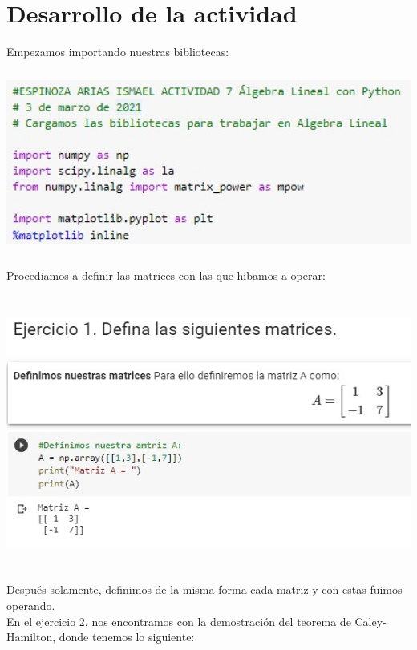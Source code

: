 \documentclass[12pt]{article}
\begin{document}


\section{Desarrollo de la actividad}

Empezamos importando nuestras bibliotecas:

    \begin{center}
	\includegraphics[height=6cm]{Bibliotecas.jpeg}\\
    \end{center}
    
Procediamos a definir las matrices con las que hibamos a operar:

    \begin{center}
	\includegraphics[height=9cm]{E1.jpeg}\\
    \end{center}

Después solamente, definimos de la misma forma cada matriz y con estas fuimos operando.\\
En el ejercicio 2, nos encontramos con la demostración del teorema de Caley-Hamilton, donde tenemos lo siguiente:
\end{document}

